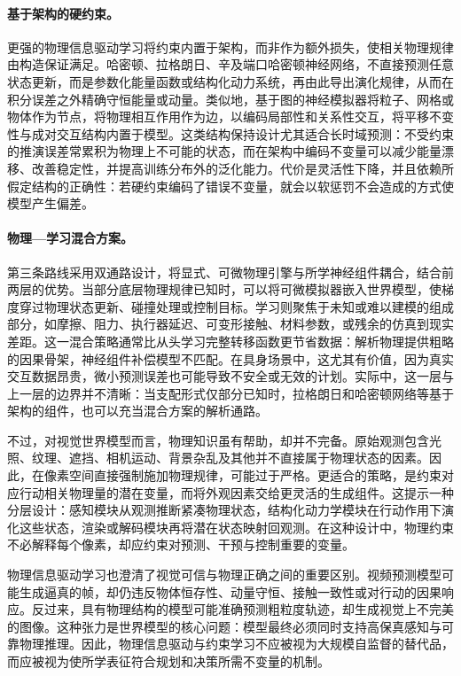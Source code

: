 \paragraph{基于架构的硬约束。}
更强的物理信息驱动学习将约束内置于架构，而非作为额外损失，使相关物理规律由构造保证满足。哈密顿、拉格朗日、辛及端口哈密顿神经网络，不直接预测任意状态更新，而是参数化能量函数或结构化动力系统，再由此导出演化规律，从而在积分误差之外精确守恒能量或动量\citep{greydanus2019hamiltonian,cranmer2020lagrangian,zhong2020symplectic}。类似地，基于图的神经模拟器将粒子、网格或物体作为节点，将物理相互作用作为边，以编码局部性和关系性交互，将平移不变性与成对交互结构内置于模型\citep{sanchez2020learning,pfaff2021learning}。这类结构保持设计尤其适合长时域预测：不受约束的推演误差常累积为物理上不可能的状态，而在架构中编码不变量可以减少能量漂移、改善稳定性，并提高训练分布外的泛化能力。代价是灵活性下降，并且依赖所假定结构的正确性：若硬约束编码了错误不变量，就会以软惩罚不会造成的方式使模型产生偏差。

\paragraph{物理—学习混合方案。}
第三条路线采用双通路设计，将显式、可微物理引擎与所学神经组件耦合，结合前两层的优势。当部分底层物理规律已知时，可以将可微模拟器嵌入世界模型，使梯度穿过物理状态更新、碰撞处理或控制目标\citep{de2018end,hu2020difftaichi,freeman2021brax}。学习则聚焦于未知或难以建模的组成部分，如摩擦、阻力、执行器延迟、可变形接触、材料参数，或残余的仿真到现实差距。这一混合策略通常比从头学习完整转移函数更节省数据：解析物理提供粗略的因果骨架，神经组件补偿模型不匹配。在具身场景中，这尤其有价值，因为真实交互数据昂贵，微小预测误差也可能导致不安全或无效的计划。实际中，这一层与上一层的边界并不清晰：当支配形式仅部分已知时，拉格朗日和哈密顿网络等基于架构的组件，也可以充当混合方案的解析通路。

不过，对视觉世界模型而言，物理知识虽有帮助，却并不完备。原始观测包含光照、纹理、遮挡、相机运动、背景杂乱及其他并不直接属于物理状态的因素。因此，在像素空间直接强制施加物理规律，可能过于严格。更适合的策略，是约束对应行动相关物理量的潜在变量，而将外观因素交给更灵活的生成组件。这提示一种分层设计：感知模块从观测推断紧凑物理状态，结构化动力学模块在行动作用下演化这些状态，渲染或解码模块再将潜在状态映射回观测。在这种设计中，物理约束不必解释每个像素，却应约束对预测、干预与控制重要的变量。

物理信息驱动学习也澄清了视觉可信与物理正确之间的重要区别。视频预测模型可能生成逼真的帧，却仍违反物体恒存性、动量守恒、接触一致性或对行动的因果响应。反过来，具有物理结构的模型可能准确预测粗粒度轨迹，却生成视觉上不完美的图像。这种张力是世界模型的核心问题：模型最终必须同时支持高保真感知与可靠物理推理。因此，物理信息驱动与约束学习不应被视为大规模自监督的替代品，而应被视为使所学表征符合规划和决策所需不变量的机制。

